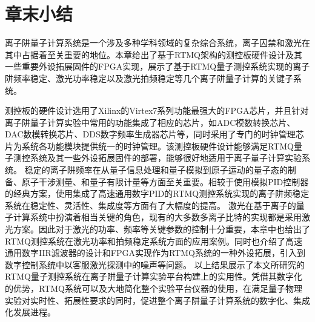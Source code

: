 \newpage
\section[章末小结]{章末小结}

离子阱量子计算系统是一个涉及多种学科领域的复杂综合系统，离子囚禁和激光在其中占据着至关重要的地位。本章给出了基于RTMQ架构的测控板硬件设计及其一些重要外设拓展固件的FPGA实现，展示了基于RTMQ量子测控系统实现的离子阱频率稳定、激光功率稳定以及激光拍频稳定等几个离子阱量子计算的关键子系统。

测控板的硬件设计选用了Xilinx的Virtex7系列功能最强大的FPGA芯片，并且针对离子阱量子计算实验中常用的功能集成了相应的芯片，如ADC模数转换芯片、DAC数模转换芯片、DDS数字频率生成器芯片等，同时采用了专门的时钟管理芯片为系统各功能模块提供统一的时钟管理。该测控板硬件设计能够满足RTMQ量子测控系统及其一些外设拓展固件的部署，能够很好地适用于离子量子计算实验系统。
稳定的离子阱频率在从量子信息处理和量子模拟到原子运动的量子态的制备、原子干涉测量、和量子有限计量等方面至关重要。相较于使用模拟PID控制器的经典方案，使用集成了高速通用数字PID的RTMQ测控系统实现的离子阱频稳定系统在稳定性、灵活性、集成度等方面有了大幅度的提高。
激光在基于离子的量子计算系统中扮演着相当关键的角色，现有的大多数多离子比特的实现都是采用激光方案。因此对于激光的功率、频率等关键参数的控制十分重要，本章中也给出了RTMQ测控系统在激光功率和拍频稳定系统方面的应用案例。同时也介绍了高速通用数字IIR滤波器的设计和FPGA实现作为RTMQ系统的一种外设拓展，引入到数字控制系统中以客服激光探测中的噪声等问题。
以上结果展示了本文所研究的RTMQ量子测控系统在离子阱量子计算实验平台构建上的实用性。凭借其数字化的优势，RTMQ系统可以及大地简化整个实验平台仪器的使用，在满足量子物理实验对实时性、拓展性要求的同时，促进整个离子阱量子计算系统的数字化、集成化发展进程。





